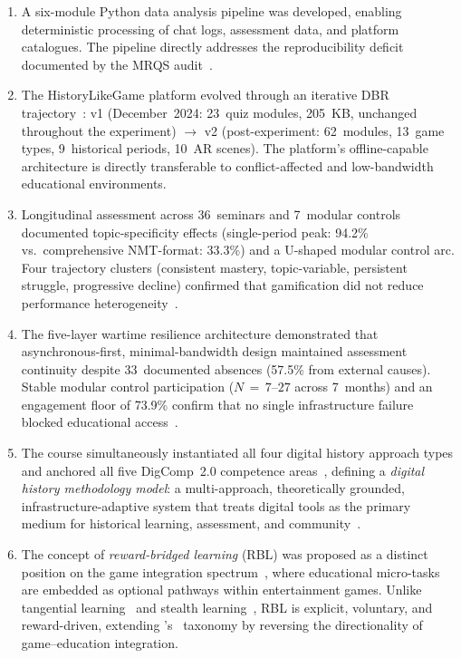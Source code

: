 {\begin{enumerate}
\item A six-module Python data analysis pipeline was developed, enabling deterministic
processing of chat logs, assessment data, and platform catalogues. The pipeline directly
addresses the reproducibility deficit documented by the MRQS audit~\cite{Korniienko2025mrqs}.

\item The HistoryLikeGame platform evolved through an iterative DBR
trajectory~\cite{Reeves2003, Korniienko2024hlg}: v1 (December~2024: 23~quiz modules,
205~KB, unchanged throughout the experiment) $\to$ v2 (post-experiment: 62~modules,
13~game types, 9~historical periods, 10~AR scenes). The platform's offline-capable
architecture is directly transferable to conflict-affected and low-bandwidth educational
environments.

\item Longitudinal assessment across 36~seminars and 7~modular controls documented
topic-specificity effects (single-period peak: 94.2\% vs.\ comprehensive NMT-format:
33.3\%) and a U-shaped modular control arc. Four trajectory clusters (consistent mastery,
topic-variable, persistent struggle, progressive decline) confirmed that gamification
did not reduce performance heterogeneity~\cite{SailerHomner2020, BaiHewHuang2020}.

\item The five-layer wartime resilience architecture demonstrated that asynchronous-first,
minimal-bandwidth design maintained assessment continuity despite 33~documented absences
(57.5\% from external causes). Stable modular control participation ($N\,{=}\,7$--$27$
across 7~months) and an engagement floor of 73.9\% confirm that no single infrastructure
failure blocked educational access~\cite{Burde2017, UNESCO2023}.

\item The course simultaneously instantiated all four digital history approach types and
anchored all five DigComp~2.0 competence areas~\cite{Vuorikari2016}, defining a
\emph{digital history methodology model}: a multi-approach, theoretically grounded,
infrastructure-adaptive system that treats digital tools as the primary medium for
historical learning, assessment, and community~\cite{Ertmer1999, Humeniuk2022113}.

\item The concept of \textit{reward-bridged learning} (RBL) was proposed as a distinct
position on the game integration spectrum~\cite{RBL2025}, where educational micro-tasks
are embedded as optional pathways within entertainment games. Unlike tangential
learning~\cite{frith2021} and stealth learning~\cite{ShuteFormative2008}, RBL is explicit,
voluntary, and reward-driven, extending \citeauthor{Deterding2011}'s~\cite{Deterding2011}
taxonomy by reversing the directionality of game--education integration.


\end{enumerate}}
